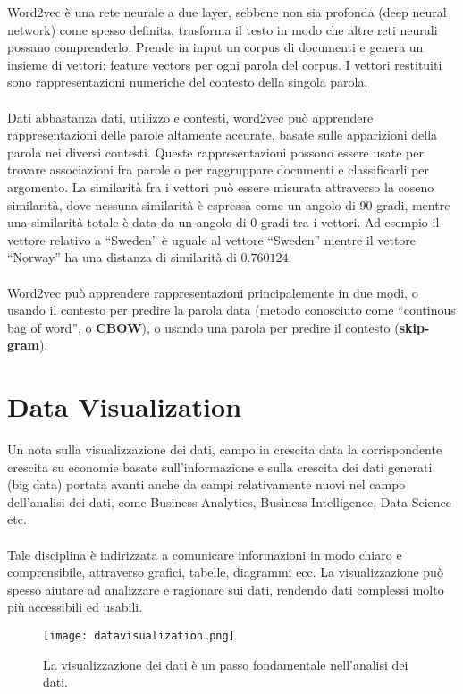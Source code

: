 Word2vec è una rete neurale a due layer, sebbene non sia profonda (deep neural network) come spesso definita, trasforma il testo in modo che altre reti neurali possano comprenderlo. Prende in input un corpus di documenti e genera un insieme di vettori: feature vectors per ogni parola del corpus. I vettori restituiti sono rappresentazioni numeriche del contesto della singola parola. 
\\\\
Dati abbastanza dati, utilizzo e contesti, word2vec può apprendere rappresentazioni delle parole altamente accurate, basate sulle apparizioni della parola nei diversi contesti. Queste rappresentazioni possono essere usate per trovare associazioni fra parole o per raggruppare documenti e classificarli per argomento. La similarità fra i vettori può essere misurata attraverso la coseno similarità, dove nessuna similarità è espressa come un angolo di 90 gradi, mentre una similarità totale è data  da un angolo di 0 gradi tra i vettori. Ad esempio il vettore relativo a “Sweden” è uguale al vettore “Sweden” mentre il vettore “Norway” ha una distanza di similarità di $0.760124$.
\\\\
Word2vec può apprendere rappresentazioni principalemente in due modi, o usando il contesto per predire la parola data (metodo conosciuto come “continous bag of word”, o \textbf{CBOW}), o usando una parola per predire il contesto (\textbf{skip-gram}).



\section{Data Visualization}
Un nota sulla visualizzazione dei dati, campo in crescita data la corrispondente crescita su economie basate sull’informazione e sulla crescita dei dati generati (big data) portata avanti anche da campi relativamente nuovi nel campo dell’analisi dei dati, come Business Analytics, Business Intelligence, Data Science etc.
\\\\
Tale disciplina è indirizzata a comunicare informazioni in modo chiaro e comprensibile, attraverso grafici, tabelle, diagrammi ecc. La visualizzazione può spesso aiutare ad analizzare e ragionare sui dati, rendendo dati complessi molto più accessibili ed usabili.
\begin{figure}[htb]
	\centering
	\texttt{[image: datavisualization.png]}
	\caption{La visualizzazione dei dati è un passo fondamentale nell'analisi dei dati.}
	\label{datavisualization}
\end{figure}

